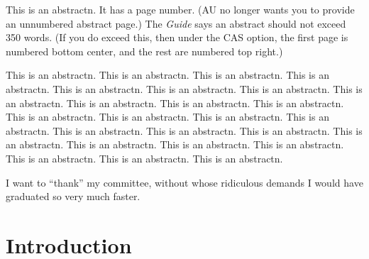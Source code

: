 \documentclass[10pt,econ,letterpaper]{authesis}
\begin{document}
\begin{frontmatter}



\abstractn

This is an abstractn.  It has a page number.
(AU no longer wants you to provide an unnumbered abstract page.)
The \emph{Guide} says an abstract should not exceed 350 words.
(If you do exceed this,
then under the CAS option, the first page is numbered bottom center, and the rest are numbered top right.)

This is an abstractn. This is an abstractn. This is an abstractn. This is an abstractn. This is an abstractn. This is an abstractn. This is an abstractn. This is an abstractn. This is an abstractn. This is an abstractn. This is an abstractn. This is an abstractn. This is an abstractn. This is an abstractn. This is an abstractn. This is an abstractn. This is an abstractn. This is an abstractn. This is an abstractn. This is an abstractn. This is an abstractn. This is an abstractn. This is an abstractn. This is an abstractn. This is an abstractn. 




\acknowledgements

I want to ``thank'' my committee,
without whose ridiculous demands I would have graduated so very much faster.


\tableofcontents

\listoftables

\listoffigures

\end{frontmatter}


\chapter{Introduction} %
\end{document}
